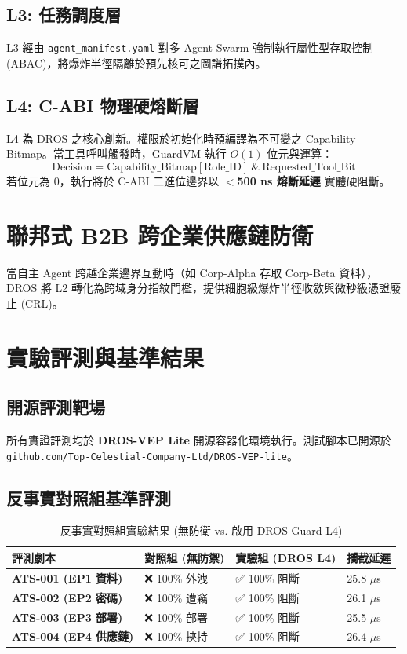 \documentclass[conference]{IEEEtran}
\begin{document}
\subsection{L3: 任務調度層}
L3 經由 \texttt{agent\_manifest.yaml} 對多 Agent Swarm 強制執行屬性型存取控制 (ABAC)，將爆炸半徑隔離於預先核可之圖譜拓撲內。

\subsection{L4: C-ABI 物理硬熔斷層}
L4 為 DROS 之核心創新。權限於初始化時預編譯為不可變之 Capability Bitmap。當工具呼叫觸發時，GuardVM 執行 $O(1)$ 位元與運算：
\begin{equation}
\text{Decision} = \text{Capability\_Bitmap}[\text{Role\_ID}] \ \text{\&} \ \text{Requested\_Tool\_Bit}
\end{equation}
若位元為 $0$，執行將於 C-ABI 二進位邊界以 \textbf{$<$500 ns 熔斷延遲} 實體硬阻斷。

\section{聯邦式 B2B 跨企業供應鏈防衛}
當自主 Agent 跨越企業邊界互動時（如 Corp-Alpha 存取 Corp-Beta 資料），DROS 將 L2 轉化為跨域身分指紋門檻，提供細胞級爆炸半徑收斂與微秒級憑證廢止 (CRL)。

\section{實驗評測與基準結果}

\subsection{開源評測靶場}
所有實證評測均於 \textbf{DROS-VEP Lite} 開源容器化環境執行。測試腳本已開源於 \texttt{github.com/Top-Celestial-Company-Ltd/DROS-VEP-lite}。

\subsection{反事實對照組基準評測}

\begin{table}[htbp]
\caption{反事實對照組實驗結果 (無防衛 vs. 啟用 DROS Guard L4)}
\begin{center}
\begin{tabular}{|p{2.3cm}|p{2.2cm}|p{2.2cm}|p{1.0cm}|}
\hline
\textbf{評測劇本} & \textbf{對照組 (無防禦)} & \textbf{實驗組 (DROS L4)} & \textbf{攔截延遲} \\ \hline
\textbf{ATS-001 (EP1 資料)} & ❌ 100\% 外洩 & ✅ 100\% 阻斷 & 25.8 $\mu$s \\ \hline
\textbf{ATS-002 (EP2 密碼)} & ❌ 100\% 遭竊 & ✅ 100\% 阻斷 & 26.1 $\mu$s \\ \hline
\textbf{ATS-003 (EP3 部署)} & ❌ 100\% 部署 & ✅ 100\% 阻斷 & 25.5 $\mu$s \\ \hline
\textbf{ATS-004 (EP4 供應鏈)} & ❌ 100\% 挾持 & ✅ 100\% 阻斷 & 26.4 $\mu$s \\ \hline
\end{tabular}
\end{center}
\end{table}
\end{document}
